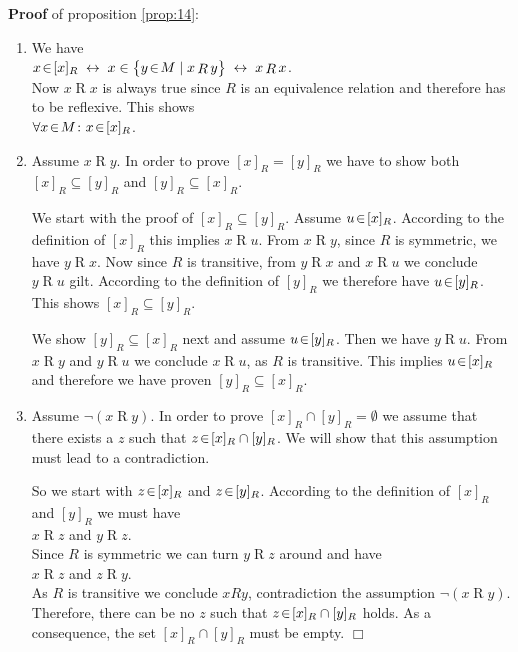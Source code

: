 \noindent
\textbf{Proof} of proposition \ref{prop:14}:  
\begin{enumerate}
\item We have
      \\[0.2cm]
      \hspace*{1.3cm}
      $   x \!\in\! [x]_R \;\leftrightarrow\;
          x \in \bigl\{ y \!\in\! M \mid x \mathop{R} y \bigr\} \;\leftrightarrow\;
          x \mathop{R} x
      $.
      \\[0.2cm]
      Now $x \mathop{R} x$ is always true since $R$ is an equivalence
      relation and therefore has to be reflexive.  This shows
      \\[0.2cm]
      \hspace*{1.3cm}
      $\forall x \!\in\! M \colon x \!\in\! [x]_R$.
\item Assume $x \mathop{R} y$.  In  order to prove $[x]_R = [y]_R$ we have to show both
      $[x]_R \subseteq [y]_R$ and $[y]_R \subseteq [x]_R$.

      We start with the proof of  $[x]_R \subseteq [y]_R$.  Assume 
      $u \!\in\! [x]_R$.  According to the definition of $[x]_R$ this implies 
      $x \mathop{R} u$.  From $x \mathop{R} y$, since $R$ is symmetric, we have
      $y \mathop{R} x$.  Now since $R$ is transitive, from $y \mathop{R} x$ and $x
      \mathop{R} u$ 
      we conclude  $y \mathop{R} u$ gilt.  According to the definition of  $[y]_R$ we
      therefore have  $u \!\in\! [y]_R$.   This shows $[x]_R \subseteq [y]_R$.

      We show $[y]_R \subseteq [x]_R$ next and assume $u \!\in\! [y]_R$.  Then we have
      $y \mathop{R} u$.  From  $x \mathop{R} y$ and $y \mathop{R} u$ we conclude 
      $x \mathop{R} u$, as $R$ is transitive.  This implies $u \!\in\! [x]_R$ and therefore we
      have proven $[y]_R \subseteq [x]_R$.
\item Assume $\neg (x \mathop{R} y)$.  In order to prove  $[x]_R \cap [y]_R = \emptyset$
      we assume that there exists a $z$ such that $z \!\in\! [x]_R \cap [y]_R$.  
      We will show that this assumption must lead to a contradiction.
  
      So we start with  $z \!\in\![x]_R$ and $z \!\in\! [y]_R$.  According to the definition of
       $[x]_R$ and $[y]_R$ we must have
      \\[0.2cm]
      \hspace*{1.3cm}      
      $x \mathop{R} z$ \quad and \quad $y \mathop{R} z$.
      \\[0.2cm]
      Since $R$ is symmetric we can turn  $y \mathop{R} z$ around and have
      \\[0.2cm]
      \hspace*{1.3cm}      
      $x \mathop{R} z$ \quad and \quad $z \mathop{R} y$.
      \\[0.2cm]
      As $R$ is transitive we conclude $x R y$, contradiction the assumption $\neg (x \mathop{R} y)$.
      Therefore, there can be no $z$ such that $z \!\in\! [x]_R \cap [y]_R$ holds.
      As a consequence, the set  $[x]_R \cap [y]_R$ must be empty.
      \hspace*{\fill} $\Box$
\end{enumerate}

